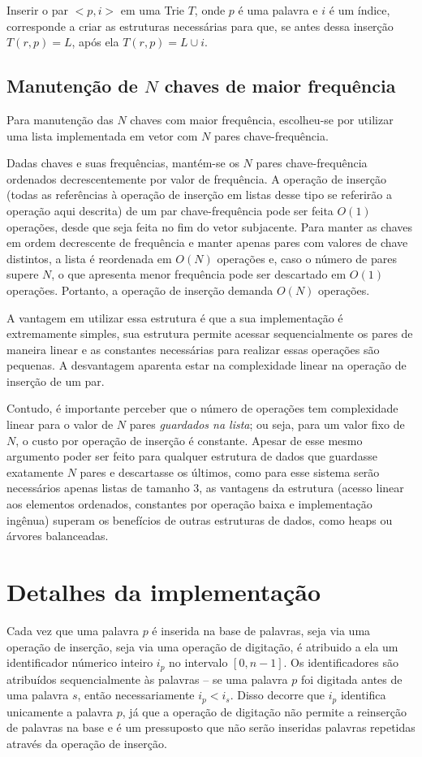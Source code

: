 \documentclass[12pt]{article}
\begin{document}
    Inserir o par $<p, i>$ em uma Trie $T$, onde $p$ é uma palavra e $i$ é um índice, corresponde a criar as estruturas necessárias para que, se antes dessa inserção $T(r, p) = L$, após ela $T(r, p) = L \cup i$.

    \subsection{Manutenção de $N$ chaves de maior frequência} \label{sec:list}
    Para manutenção das $N$ chaves com maior frequência, escolheu-se por utilizar uma lista implementada em vetor com $N$ pares chave-frequência.

    Dadas chaves e suas fre\-quên\-cias, mantém-se os $N$ pares chave-frequência ordenados decrescentemente por valor de frequência.
    A operação de inserção (todas as referências à operação de inserção em listas desse tipo se referirão a operação aqui descrita) de um par chave-frequência pode ser feita $O(1)$ operações, desde que seja feita no fim do vetor subjacente.
    Para manter as chaves em ordem decrescente de frequência e manter apenas pares com valores de chave distintos, a lista é reordenada em $O(N)$ operações e, caso o número de pares supere $N$, o que apresenta menor frequência pode ser descartado em $O(1)$ operações.
    Portanto, a operação de inserção demanda $O(N)$ operações.

    A vantagem em utilizar essa estrutura é que a sua implementação é extremamente simples, sua estrutura permite acessar sequencialmente os pares de maneira linear e as constantes necessárias para realizar essas operações são pequenas.
    A desvantagem aparenta estar na complexidade linear na operação de inserção de um par.

    Contudo, é importante perceber que o número de operações tem complexidade linear para o valor de $N$ pares \emph{guardados na lista}; ou seja, para um valor fixo de $N$, o custo por operação de inserção é constante.
    Apesar de esse mesmo argumento poder ser feito para qualquer estrutura de dados que guardasse exatamente $N$ pares e descartasse os últimos, como para esse sistema serão necessários apenas listas de tamanho 3, as vantagens da estrutura (acesso linear aos elementos ordenados, constantes por operação baixa e implementação ingênua) superam os benefícios de outras estruturas de dados, como heaps ou árvores balanceadas.

  \section{Detalhes da implementação}
    Cada vez que uma palavra $p$ é inserida na base de palavras, seja via uma operação de inserção, seja via uma operação de digitação, é atribuido a ela um identificador númerico inteiro $i_p$ no intervalo $[0, n - 1]$.
    Os identificadores são atribuídos sequencialmente às palavras -- se uma palavra $p$ foi digitada antes de uma palavra $s$, então necessariamente $i_p < i_s$.
    Disso decorre que $i_p$ identifica unicamente a palavra $p$, já que a operação de digitação não permite a reinserção de palavras na base e é um pressuposto que não serão inseridas palavras repetidas através da operação de inserção.
\end{document}
